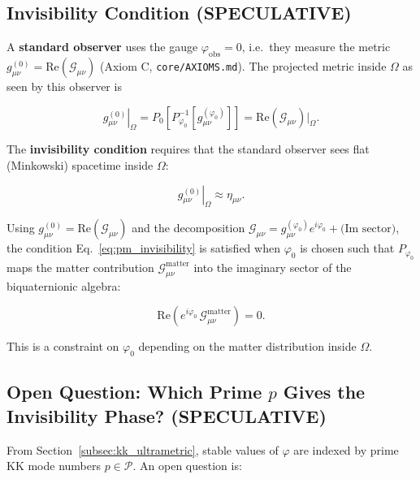 \subsection{Invisibility Condition (SPECULATIVE)}

A \textbf{standard observer} uses the gauge $\varphi_\mathrm{obs} = 0$, i.e.\ they measure the
metric $g_{\mu\nu}^{(0)} = \mathrm{Re}(\mathcal{G}_{\mu\nu})$ (Axiom C,
\texttt{core/AXIOMS.md}).  The projected metric inside $\Omega$ as seen by this observer is

\begin{equation}
\label{eq:pm_obs_metric}
\left.g_{\mu\nu}^{(0)}\right|_\Omega
= P_0\!\left[P_{\varphi_0}^{-1}\!\left[g_{\mu\nu}^{(\varphi_0)}\right]\right]
= \mathrm{Re}(\mathcal{G}_{\mu\nu})\Big|_\Omega.
\end{equation}

The \textbf{invisibility condition} requires that the standard observer sees flat (Minkowski)
spacetime inside $\Omega$:

\begin{equation}
\label{eq:pm_invisibility}
\left.g_{\mu\nu}^{(0)}\right|_\Omega \approx \eta_{\mu\nu}.
\end{equation}

Using $g_{\mu\nu}^{(0)} = \mathrm{Re}(\mathcal{G}_{\mu\nu})$ and the decomposition
$\mathcal{G}_{\mu\nu} = g_{\mu\nu}^{(\varphi_0)} e^{i\varphi_0} + \text{(Im sector)}$, the
condition Eq.~\eqref{eq:pm_invisibility} is satisfied when $\varphi_0$ is chosen such that
$P_{\varphi_0}$ maps the matter contribution $\mathcal{G}_{\mu\nu}^\mathrm{matter}$ into the
imaginary sector of the biquaternionic algebra:

\begin{equation}
\label{eq:pm_invisibility_cond}
\mathrm{Re}\!\left(e^{i\varphi_0}\,\mathcal{G}_{\mu\nu}^\mathrm{matter}\right) = 0.
\end{equation}

This is a constraint on $\varphi_0$ depending on the matter distribution inside $\Omega$.

\subsection{Open Question: Which Prime $p$ Gives the Invisibility Phase? (SPECULATIVE)}

From Section~\ref{subsec:kk_ultrametric}, stable values of $\varphi$ are indexed by prime KK
mode numbers $p \in \mathcal{P}$.  An open question is:

